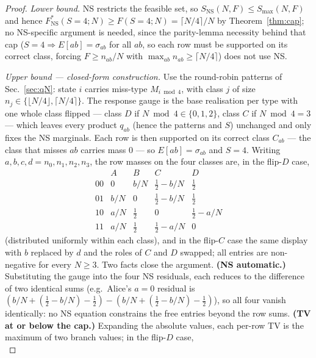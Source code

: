 \documentclass[aps,pra,reprint,superscriptaddress,floatfix]{revtex4-2}
\begin{document}
\begin{proof}
\emph{Lower bound.} NS restricts the feasible set, so
$S_{\mathrm{NS}}(N,F)\le S_{\max}(N,F)$ and hence
$F^*_{\mathrm{NS}}(S{=}4;N)\ge F(S{=}4;N)=\lceil N/4\rceil/N$ by
Theorem~\ref{thm:cap}; no NS-specific argument is needed, since the
parity-lemma necessity behind that cap ($S=4\Rightarrow E[ab]=\sigma_{ab}$
for all $ab$, so each row must be supported on its correct class, forcing
$F\ge n_{ab}/N$ with $\max_{ab}n_{ab}\ge\lceil N/4\rceil$) does not use NS.

\emph{Upper bound --- closed-form construction.} Use the round-robin
patterns of Sec.~\ref{sec:qN}: state $i$ carries miss-type
$M_{i\bmod 4}$, with class $j$ of size
$n_j\in\{\lfloor N/4\rfloor,\lceil N/4\rceil\}$. The response gauge is the
base realisation per type with one whole class flipped --- class $D$ if
$N\bmod 4\in\{0,1,2\}$, class $C$ if $N\bmod 4=3$ --- which leaves every
product $q_{ab}$ (hence the patterns and $S$) unchanged and only fixes the
NS marginals. Each row is then supported on its correct class $C_{ab}$ ---
the class that misses $ab$ carries mass $0$ --- so $E[ab]=\sigma_{ab}$ and
$S=4$. Writing $a,b,c,d=n_0,n_1,n_2,n_3$, the row masses on the four
classes are, in the flip-$D$ case,
\begin{equation}
\begin{array}{c|cccc}
 & A & B & C & D\\ \hline
00 & 0 & b/N & \tfrac12-b/N & \tfrac12\\
01 & b/N & 0 & \tfrac12-b/N & \tfrac12\\
10 & a/N & \tfrac12 & 0 & \tfrac12-a/N\\
11 & a/N & \tfrac12 & \tfrac12-a/N & 0
\end{array}
\label{eq:ns4caprows}
\end{equation}
(distributed uniformly within each class), and in the flip-$C$ case the
same display with $b$ replaced by $d$ and the roles of $C$ and $D$
swapped; all entries are non-negative for every $N\ge3$. Two facts close
the argument. \textbf{(NS automatic.)} Substituting the gauge into the
four NS residuals, each reduces to the difference of two identical sums
(e.g.\ Alice's $a{=}0$ residual is
$(b/N+(\tfrac12-b/N)-\tfrac12)-(b/N+(\tfrac12-b/N)-\tfrac12)$), so all
four vanish identically: no NS equation constrains the free entries beyond
the row sums. \textbf{(TV at or below the cap.)} Expanding the absolute
values, each per-row TV is the maximum of two branch values; in the
flip-$D$ case,
\begin{equation}

\end{equation}
\end{proof}
\end{document}
